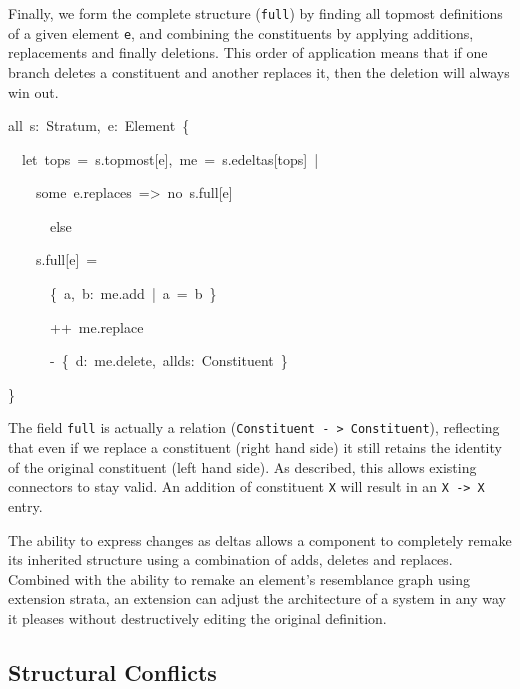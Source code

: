 Finally, we form the complete structure (\texttt{full}) by finding
all topmost definitions of a given element \texttt{e}, and combining
the constituents by applying additions, replacements and finally deletions.
This order of application means that if one branch deletes a constituent
and another replaces it, then the deletion will always win out.
\begin{lyxcode}
{\footnotesize{}all~s:~Stratum,~e:~Element~\{}{\footnotesize \par}

{\footnotesize{}~~let~tops~=~s.topmost{[}e{]},~me~=~s.edeltas{[}tops{]}~|}{\footnotesize \par}

{\footnotesize{}~~~~some~e.replaces~=>~no~s.full{[}e{]}}{\footnotesize \par}

{\footnotesize{}~~~~~~else}{\footnotesize \par}

{\footnotesize{}~~~~s.full{[}e{]}~=}{\footnotesize \par}

{\footnotesize{}~~~~~~\{~a,~b:~me.add~|~a~=~b~\}}{\footnotesize \par}

{\footnotesize{}~~~~~~++~me.replace}{\footnotesize \par}

{\footnotesize{}~~~~~~-~\{~d:~me.delete,~allds:~Constituent~\}}{\footnotesize \par}

{\footnotesize{}\}}{\footnotesize \par}
\end{lyxcode}
The field \texttt{full} is actually a relation (\texttt{Constituent
- > Constituent}), reflecting that even if we replace a constituent
(right hand side) it still retains the identity of the original constituent
(left hand side). As described, this allows existing connectors to
stay valid. An addition of constituent \texttt{X} will result in an
\texttt{X -> X} entry.

The ability to express changes as deltas allows a component to completely
remake its inherited structure using a combination of adds, deletes
and replaces. Combined with the ability to remake an element\textquoteright s
resemblance graph using extension strata, an extension can adjust
the architecture of a system in any way it pleases without destructively
editing the original definition.


\subsection{Structural Conflicts}

